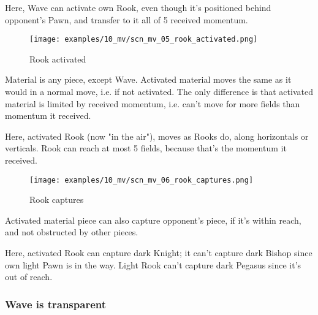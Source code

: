 Here, Wave can activate own Rook, even though it's positioned behind opponent's
Pawn, and transfer to it all of 5 received momentum.

\clearpage %

\vspace*{-2.1\baselineskip}
\noindent
\begin{figure}[!h]
\texttt{[image: examples/10\_mv/scn\_mv\_05\_rook\_activated.png]}
\vspace*{-1.3\baselineskip}
\caption{Rook activated}
\label{fig:scn_mv_05_rook_activated}
\end{figure}

\vspace*{-0.3\baselineskip}
Material is any piece, except Wave. Activated material moves the same as it would
in a normal move, i.e. if not activated. The only difference is that activated
material is limited by received momentum, i.e. can't move for more fields than
momentum it received.

Here, activated Rook (now "in the air"), moves as Rooks do, along horizontals or
verticals. Rook can reach at most 5 fields, because that's the momentum it received.

\clearpage %

\vspace*{-2.1\baselineskip}
\noindent
\begin{figure}[!h]
\texttt{[image: examples/10\_mv/scn\_mv\_06\_rook\_captures.png]}
\caption{Rook captures}
\label{fig:scn_mv_06_rook_captures}
\end{figure}

Activated material piece can also capture opponent's piece, if it's within reach,
and not obstructed by other pieces.

Here, activated Rook can capture dark Knight; it can't capture dark Bishop since
own light Pawn is in the way. Light Rook can't capture dark Pegasus since it's out
of reach.

\clearpage %

\subsubsection*{Wave is transparent}
\label{sec:Miranda's veil/Wave/Cascading Waves/Wave is transparent}

